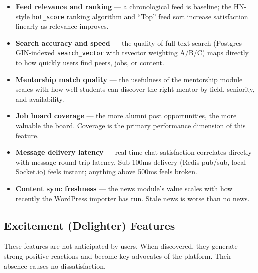 \documentclass[12pt, a4paper]{article}
\begin{document}
\begin{itemize}
    \item \textbf{Feed relevance and ranking} --- a chronological feed is baseline;
    the HN-style \texttt{hot\_score} ranking algorithm and ``Top'' feed sort increase
    satisfaction linearly as relevance improves.
    \item \textbf{Search accuracy and speed} --- the quality of full-text search
    (Postgres GIN-indexed \texttt{search\_vector} with tsvector weighting A/B/C) maps
    directly to how quickly users find peers, jobs, or content.
    \item \textbf{Mentorship match quality} --- the usefulness of the mentorship
    module scales with how well students can discover the right mentor by field,
    seniority, and availability.
    \item \textbf{Job board coverage} --- the more alumni post opportunities, the more
    valuable the board. Coverage is the primary performance dimension of this feature.
    \item \textbf{Message delivery latency} --- real-time chat satisfaction correlates
    directly with message round-trip latency. Sub-100ms delivery (Redis pub/sub, local
    Socket.io) feels instant; anything above 500ms feels broken.
    \item \textbf{Content sync freshness} --- the news module's value scales with how
    recently the WordPress importer has run. Stale news is worse than no news.
\end{itemize}

\subsection{Excitement (Delighter) Features}

These features are not anticipated by users. When discovered, they generate strong
positive reactions and become key advocates of the platform. Their absence causes no
dissatisfaction.
\end{document}
